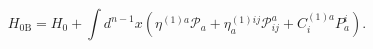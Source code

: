 \begin{equation}
H_{0\mathrm{B}}=H_{0}+\int d^{n-1}x\left( \eta ^{(1)a}\mathcal{P}_{a}+\eta
_{a}^{(1)ij}\mathcal{P}_{ij}^{a}+C_{i}^{(1)a}P_{a}^{i}\right) .  \label{f30}
\end{equation}

